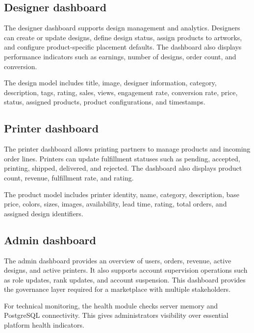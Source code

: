 
\subsection{Designer dashboard}
The designer dashboard supports design management and analytics.
Designers can create or update designs, define design status, assign products to artworks, and configure product-specific placement defaults.
The dashboard also displays performance indicators such as earnings, number of designs, order count, and conversion.

The design model includes title, image, designer information, category, description, tags, rating, sales, views, engagement rate, conversion rate, price, status, assigned products, product configurations, and timestamps.


\subsection{Printer dashboard}
The printer dashboard allows printing partners to manage products and incoming order lines.
Printers can update fulfillment statuses such as pending, accepted, printing, shipped, delivered, and rejected.
The dashboard also displays product count, revenue, fulfillment rate, and rating.

The product model includes printer identity, name, category, description, base price, colors, sizes, images, availability, lead time, rating, total orders, and assigned design identifiers.


\subsection{Admin dashboard}
The admin dashboard provides an overview of users, orders, revenue, active designs, and active printers.
It also supports account supervision operations such as role updates, rank updates, and account suspension.
This dashboard provides the governance layer required for a marketplace with multiple stakeholders.

For technical monitoring, the health module checks server memory and PostgreSQL connectivity.
This gives administrators visibility over essential platform health indicators.

